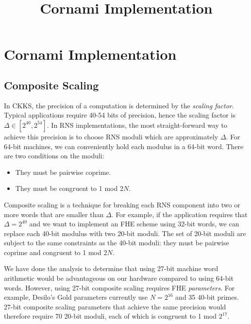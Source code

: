 \documentclass[../../fheimpl.tex]{subfiles}
\begin{document}
	\pagestyle{fancy}
	
	\ifcompileasbook
	\else
	\title{Cornami Implementation}
	\hypersetup{pageanchor=false}
	\maketitle
	\listoffixmes
	\tableofcontents
	\compileasbooktrue
	\hypersetup{pageanchor=true}
	\fi
	
	\section{Cornami Implementation}
	
	\subsection{Composite Scaling}
	In CKKS, the precision of a computation is determined by the \emph{scaling factor}. Typical applications require 40-54 bits of precision, hence the scaling factor is $\Delta\in[2^{40},2^{54}]$. In RNS implementations, the most straight-forward way to achieve this precision is to choose RNS moduli which are approximately $\Delta$. For 64-bit machines, we can conveniently hold each modulus in a 64-bit word. There are two conditions on the moduli:
	\begin{itemize}
		\item They must be pairwise coprime.
		\item They must be congruent to 1 mod $2N$.
	\end{itemize}
	
	Composite scaling is a technique for breaking each RNS component into two or more words that are smaller than $\Delta$. For example, if the application requires that $\Delta=2^40$ and we want to implement an FHE scheme using 32-bit words, we can replace each 40-bit modulus with two 20-bit moduli. The set of 20-bit moduli are subject to the same constraints as the 40-bit moduli: they must be pairwise coprime and congruent to 1 mod $2N$.
	
	We have done the analysis to determine that using 27-bit machine word arithmetic would be advantageous on our hardware compared to using 64-bit words. However, using 27-bit composite scaling requires FHE \emph{parameters}. For example, Desilo's Gold parameters currently use $N=2^{16}$ and 35 40-bit primes. 27-bit composite scaling parameters that achieve the same precision would therefore require 70 20-bit moduli, each of which is congruent to 1 mod $2^{17}$.
	
\end{document}
